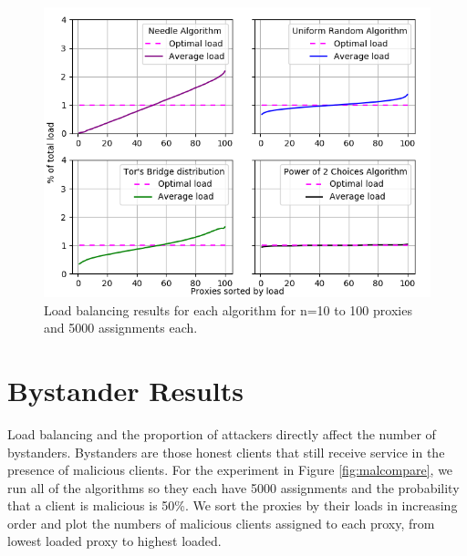 \begin{figure}[h!]
\centering
     \includegraphics[width=1.0\textwidth]{fig/load_balance_comparison_to_5000_100.png}
    \caption{Load balancing results for each algorithm for n=10 to 100 proxies and 5000 assignments each.}

    \label{fig:lbcomp}
\end{figure}


\section{Bystander Results}
\label{sec:bystandereval}

Load balancing and the proportion of attackers directly affect the number of bystanders. Bystanders are those honest clients that still receive service in the presence of malicious clients. For the experiment in Figure \ref{fig:malcompare}, we run all of the algorithms so they each have 5000 assignments and the probability that a client is malicious is 50\%. We sort the proxies by their loads in increasing order and plot the numbers of malicious clients assigned to each proxy, from lowest loaded proxy to highest loaded.

